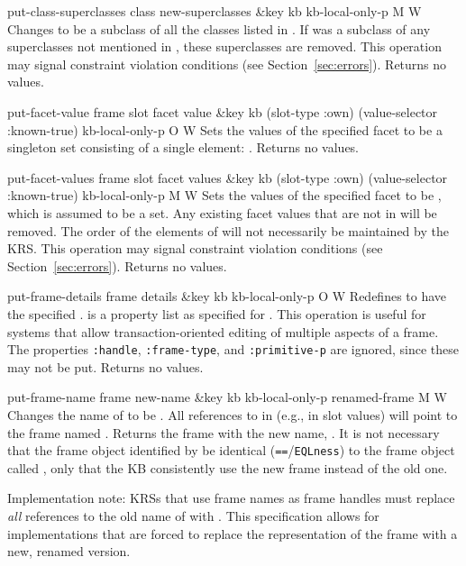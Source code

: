 \begin{okbcop}{put-class-superclasses}{ class new-superclasses \&key kb kb-local-only-p} { \void } { M } { W } {  }
Changes  to be a subclass of all the classes listed in
   .  If  was a subclass of any
   superclasses not mentioned in , these superclasses
   are removed.
   This operation may signal constraint violation conditions
   (see Section~\ref{sec:errors}).  Returns no values.
\end{okbcop}

\begin{okbcop}{put-facet-value}{ frame slot facet value \&key kb (slot-type :own) (value-selector :known-true) kb-local-only-p} { \void } { O } { W } {  }
Sets the values of the specified facet to be a singleton set
   consisting of a single element: .  Returns no values.
\end{okbcop}

\begin{okbcop}{put-facet-values}{ frame slot facet values \&key kb (slot-type :own) (value-selector :known-true) kb-local-only-p} { \void } { M } { W } {  }
Sets the values of the specified facet to be
   , which is assumed to be a set.  Any existing facet values
   that are not in  will be removed.  The order of the elements of
    will not necessarily be maintained by the KRS.
   This operation may signal constraint violation conditions
   (see Section~\ref{sec:errors}).  Returns no values.
\end{okbcop}

\begin{okbcop}{put-frame-details}{ frame details \&key kb kb-local-only-p} { \void } { O } { W } {  }
Redefines  to have the specified .
    is a property list as specified for
   .  This operation is useful for systems that allow
   transaction-oriented editing of multiple aspects of a frame.
   The properties {\tt :handle}, {\tt :frame-type}, and {\tt :primitive-p}
   are ignored, since these may not be put.
   Returns no values.
\end{okbcop}

\begin{okbcop}{put-frame-name}{ frame new-name \&key kb kb-local-only-p} { renamed-frame } { M } { W } {  }
Changes the name of  to be .  All references
   to  in  (e.g., in slot values) will point to the
   frame named .  Returns the frame with the new name,
   .  It is not necessary that the frame object identified
   by  be identical ({\tt ==}/{\tt EQLness}) to the frame
   object called , only that the KB consistently use the
   new frame instead of the old one.
   
   Implementation note:  KRSs that use frame names as frame handles must
   replace {\em all} references to the old name of  with
   .  This specification allows for implementations that
   are forced to replace the representation of the frame with a new, renamed
   version.
\end{okbcop}

